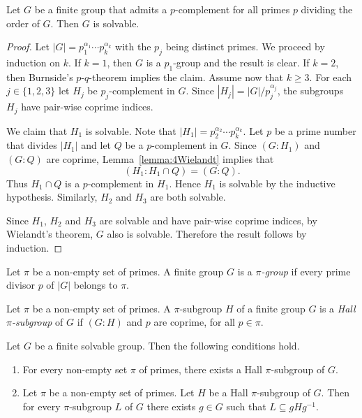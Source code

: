 \begin{theorem}[Hall]
	\label{theorem:Hall:solvable}
	Let $G$ be a finite group that admits a $p$-complement for all primes
	$p$ dividing the order of $G$. Then $G$ is solvable. 
\end{theorem}

\begin{proof}
	Let $|G|=p_1^{\alpha_1}\cdots
	p_k^{\alpha_k}$ with the $p_j$ being distinct primes. We proceed by induction on 
	$k$. If $k=1$, then $G$ is a $p_1$-group and the result is clear. If $k=2$, then 
	Burnside's $p$-$q$-theorem implies the claim. Assume now that $k\geq3$. For each 
	$j\in\{1,2,3\}$ let $H_j$ be $p_j$-complement in
	$G$. Since $|H_j|=|G|/p_j^{\alpha_j}$, the subgroups $H_j$ have pair-wise coprime indices. 
	
	We claim that $H_1$ is solvable. Note that $|H_1|=p_2^{\alpha_2}\cdots
	p_k^{\alpha_k}$. Let $p$ be a prime number that divides $|H_1|$ and let $Q$ be a 
	$p$-complement in $G$. 
	Since $(G:H_1)$ and $(G:Q)$ are coprime, Lemma~\ref{lemma:4Wielandt} implies that 
	\[
	(H_1:H_1\cap Q)=(G:Q).
	\]
	Thus $H_1\cap Q$ is a $p$-complement in $H_1$. Hence $H_1$ is
	solvable by the inductive hypothesis. Similarly, $H_2$ and 
	$H_3$ are both solvable. 
	
	Since $H_1$, $H_2$ and $H_3$ are solvable and have  pair-wise coprime indices, by Wielandt's theorem, $G$ also is solvable.
	Therefore the result follows by induction. 
\end{proof}

\begin{definition}
Let $\pi$ be a non-empty set of primes. A finite group $G$ is a {\em $\pi$-group} if every prime divisor $p$ of $|G|$ belongs to $\pi$.  
\end{definition}

\begin{definition}
Let $\pi$ be a non-empty set of primes. A $\pi$-subgroup $H$ of a finite group $G$ is a {\em Hall $\pi$-subgroup} of $G$ if $(G:H)$ and $p$ are coprime, for all $p\in \pi$.
\end{definition}

\begin{theorem}[Hall]\label{thm:Hall_pi_subgroup} 
Let $G$ be a finite solvable group. Then the following conditions hold.
\begin{enumerate}
    \item For every non-empty set $\pi$ of primes, there exists a Hall $\pi$-subgroup of $G$.
    \item Let $\pi$ be a non-empty set of primes. Let $H$ be a Hall $\pi$-subgroup of $G$. Then for every
    $\pi$-subgroup $L$ of $G$ there exists $g\in G$ such that $L\subseteq gHg^{-1}$.
\end{enumerate}
\end{theorem}

